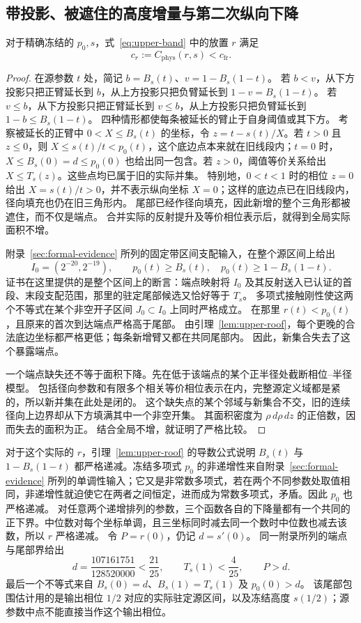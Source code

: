 \subsection{带投影、被遮住的高度增量与第二次纵向下降}
\label{subsec:upper-profile-chain}

\begin{proposition}[固定带投影严格节省面积]
\label{prop:upper-band}
对于精确冻结的 $p_0,s$，式~\eqref{eq:upper-band} 中的放置 $r$ 满足
\[
 c_r:=C_{\mathrm{phys}}(r,s)<c_{\mathrm{fr}}.
\]
\end{proposition}

\begin{proof}
在源参数 $t$ 处，简记 $b=B_s(t)$、$v=1-B_s(1-t)$。
若 $b<v$，从下方投影只把正臂延长到 $b$，从上方投影只把负臂延长到 $1-v=B_s(1-t)$。
若 $v\le b$，从下方投影只把正臂延长到 $v\le b$，从上方投影只把负臂延长到 $1-b\le B_s(1-t)$。
四种情形都使每条被延长的臂止于自身阈值或其下方。
考察被延长的正臂中 $0<X\le B_s(t)$ 的坐标，令 $z=t-s(t)/X$。若 $t>0$ 且 $z\le0$，则 $X\le s(t)/t<p_0(t)$，这个底边点本来就在旧线段内；$t=0$ 时，$X\le B_s(0)=d\le p_0(0)$ 也给出同一包含。若 $z>0$，阈值等价关系给出 $X\le T_s(z)$。这些点均已属于旧的实际并集。
特别地，$0<t<1$ 时的相位 $z=0$ 给出 $X=s(t)/t>0$，并不表示纵向坐标 $X=0$；这样的底边点已在旧线段内，径向填充也仍在旧三角形内。
尾部已经作径向填充，因此新增的整个三角形都被遮住，而不仅是端点。
合并实际的反射提升及等价相位表示后，就得到全局实际面积不增。

附录~\ref{sec:formal-evidence} 所列的固定带区间支配输入，在整个源区间上给出
\[
 I_0=(2^{-20},2^{-19}),\qquad
 p_0(t)\ge B_s(t),\quad p_0(t)\ge1-B_s(1-t).
\]
证书在这里提供的是整个区间上的断言：端点映射将 $I_0$ 及其反射送入已认证的首段、末段支配范围，那里的驻定尾部候选又恰好等于 $T_s$。
多项式接触刚性使这两个不等式在某个非空开子区间 $J_0\subset I_0$ 上同时严格成立。
在那里 $r(t)<p_0(t)$，且原来的首次到达端点严格高于尾部。
由引理~\ref{lem:upper-roof}，每个更晚的合法底边坐标都严格更低；每条新增臂又都在共同尾部内。
因此，新集合失去了这个暴露端点。

一个端点缺失还不等于面积下降。先在低于该端点的某个正半径处截断相位--半径模型。
包括径向参数和有限多个相关等价相位表示在内，完整源定义域都是紧的，所以新并集在此处是闭的。
这个缺失点的某个邻域与新集合不交，旧的连续径向上边界却从下方填满其中一个非空开集。
其面积密度为 $\rho\,d\rho\,dz$ 的正倍数，因而失去的面积为正。
结合全局不增，就证明了严格比较。
\end{proof}

对于这个实际的 $r$，引理~\ref{lem:upper-roof} 的导数公式说明 $B_s(t)$ 与 $1-B_s(1-t)$ 都严格递减。冻结多项式 $p_0$ 的非递增性来自附录~\ref{sec:formal-evidence} 所列的单调性输入；它又是非常数多项式，若在两个不同参数处取值相同，非递增性就迫使它在两者之间恒定，进而成为常数多项式，矛盾。因此 $p_0$ 也严格递减。
对任意两个递增排列的参数，三个函数各自的下降量都有一个共同的正下界。中位数对每个坐标单调，且三坐标同时减去同一个数时中位数也减去该数，所以 $r$ 严格递减。
令 $P=r(0)$，仍记 $d=s'(0)$。
同一附录所列的端点与尾部界给出
\[
 d=\frac{107161751}{128520000}<\frac{21}{25},
 \qquad T_s(1)<\frac4{25},\qquad P>d.
\]
最后一个不等式来自 $B_s(0)=d$、$B_s(1)=T_s(1)$ 及 $p_0(0)>d$。
该尾部包围估计用的是输出相位 $1/2$ 对应的实际驻定源区间，以及冻结高度 $s(1/2)$；源参数中点不能直接当作这个输出相位。

